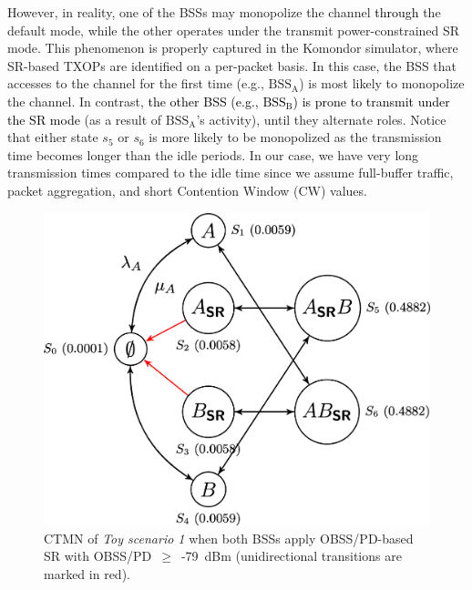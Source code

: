 \documentclass[preprint,12pt]{elsarticle}
\begin{document}
However, in reality, one of the BSSs may monopolize the channel \textcolor{black}{through} the default mode, while the other operates under the transmit power-constrained SR mode. This phenomenon is properly captured in the Komondor simulator, where SR-based TXOPs are identified on a per-packet basis. In this case, the BSS that accesses to the channel for the first time (e.g., $\text{BSS}_\text{A}$) is most likely to monopolize the channel. In contrast, \textcolor{black}{the other BSS (e.g., $\text{BSS}_\text{B}$) is prone to transmit under the SR mode} (as a result of $\text{BSS}_\text{A}$'s activity), until they alternate roles. Notice that either state $s_5$  or $s_6$ is more likely to be monopolized as the transmission time becomes longer than the idle periods. In our case, we have very long transmission times compared to the idle time since we assume full-buffer traffic, packet aggregation, and short Contention Window (CW) values.

\begin{figure}[ht!]
	\centering    
	\includegraphics[width=.55\columnwidth]{ctmn_toy_scenario_1c}
	\caption{CTMN of \emph{Toy scenario 1} when both BSSs apply OBSS/PD-based SR with OBSS/PD~$\geq$~-79~dBm (unidirectional transitions are marked in red).}
	\label{fig:ctmn_toy_scenario_1c}
\end{figure}

\end{document}
